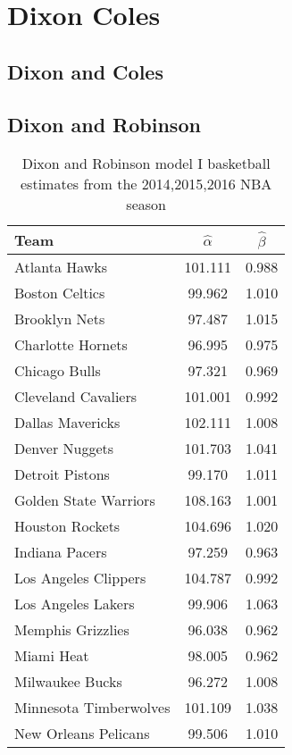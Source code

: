 \chapter{Dixon Coles}


\section{Dixon and Coles}



\section{Dixon and Robinson}

\begin{table}[t]
\centering
\caption{Dixon and Robinson model I basketball estimates from the 2014,2015,2016 NBA season}
\begin{tabular}{|l|c|c|}
\hline
\textbf{Team}  & \textbf{$\hat{\alpha}$} & \textbf{$\hat{\beta}$} \\ \hline
Atlanta Hawks  & 101.111 & 0.988\\ \hline
Boston Celtics & 99.962 & 1.010\\ \hline
Brooklyn Nets  & 97.487 & 1.015\\ \hline
Charlotte Hornets & 96.995 & 0.975\\ \hline
Chicago Bulls & 97.321 & 0.969\\ \hline
Cleveland Cavaliers & 101.001 & 0.992\\ \hline
Dallas Mavericks & 102.111 & 1.008 \\ \hline
Denver Nuggets & 101.703 & 1.041\\ \hline
Detroit Pistons & 99.170 & 1.011\\ \hline
Golden State Warriors & 108.163 & 1.001\\ \hline
Houston Rockets & 104.696 & 1.020 \\ \hline
Indiana Pacers & 97.259 & 0.963 \\ \hline
Los Angeles Clippers & 104.787 & 0.992\\ \hline
Los Angeles Lakers & 99.906 & 1.063 \\ \hline
Memphis Grizzlies & 96.038 & 0.962\\ \hline
Miami Heat & 98.005 & 0.962 \\ \hline
Milwaukee Bucks & 96.272 & 1.008\\ \hline
Minnesota Timberwolves & 101.109 & 1.038\\ \hline
New Orleans Pelicans & 99.506 & 1.010\\ \hline

\end{tabular}
\end{table}
